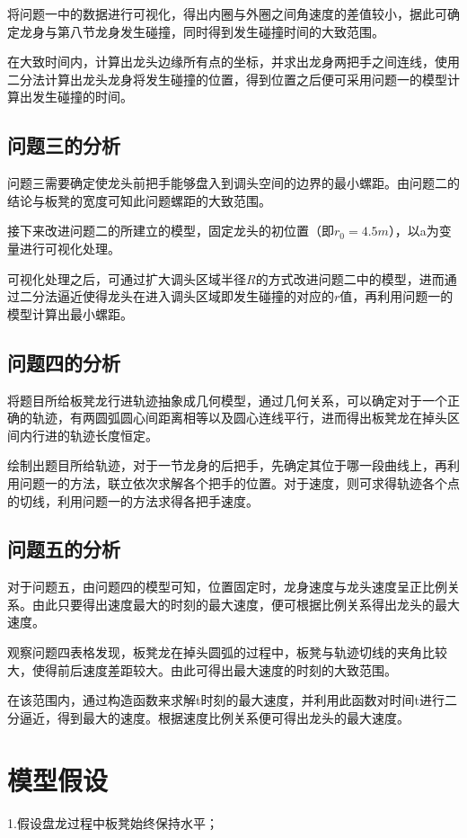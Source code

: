 \documentclass[withoutpreface,bwprint]{cumcmthesis} %
\begin{document}
将问题一中的数据进行可视化，得出内圈与外圈之间角速度的差值较小，据此可确定龙身与第八节龙身发生碰撞，同时得到发生碰撞时间的大致范围。

在大致时间内，计算出龙头边缘所有点的坐标，并求出龙身两把手之间连线，使用二分法计算出龙头龙身将发生碰撞的位置，得到位置之后便可采用问题一的模型计算出发生碰撞的时间。

\subsection{问题三的分析}

问题三需要确定使龙头前把手能够盘入到调头空间的边界的最小螺距。由问题二的结论与板凳的宽度可知此问题螺距的大致范围。

接下来改进问题二的所建立的模型，固定龙头的初位置（即$r_{0} = 4.5m$），以a为变量进行可视化处理。

可视化处理之后，可通过扩大调头区域半径$R$的方式改进问题二中的模型，进而通过二分法逼近使得龙头在进入调头区域即发生碰撞的对应的$r$值，再利用问题一的模型计算出最小螺距。
\subsection{问题四的分析}
将题目所给板凳龙行进轨迹抽象成几何模型，通过几何关系，可以确定对于一个正确的轨迹，有两圆弧圆心间距离相等以及圆心连线平行，进而得出板凳龙在掉头区间内行进的轨迹长度恒定。

绘制出题目所给轨迹，对于一节龙身的后把手，先确定其位于哪一段曲线上，再利用问题一的方法，联立依次求解各个把手的位置。对于速度，则可求得轨迹各个点的切线，利用问题一的方法求得各把手速度。
\subsection{问题五的分析}
对于问题五，由问题四的模型可知，位置固定时，龙身速度与龙头速度呈正比例关系。由此只要得出速度最大的时刻的最大速度，便可根据比例关系得出龙头的最大速度。

观察问题四表格发现，板凳龙在掉头圆弧的过程中，板凳与轨迹切线的夹角比较大，使得前后速度差距较大。由此可得出最大速度的时刻的大致范围。

在该范围内，通过构造函数来求解t时刻的最大速度，并利用此函数对时间t进行二分逼近，得到最大的速度。根据速度比例关系便可得出龙头的最大速度。
\section{模型假设}

1.假设盘龙过程中板凳始终保持水平；
\end{document}
